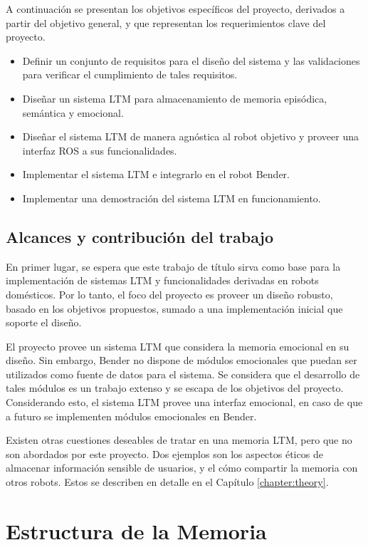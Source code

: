 A continuación se presentan los objetivos específicos del proyecto, derivados a partir del objetivo general, y que representan los requerimientos clave del proyecto.
\begin{itemize}
	\item Definir un conjunto de requisitos para el diseño del sistema y las validaciones para verificar el cumplimiento de tales requisitos.
	\item Diseñar un sistema LTM para almacenamiento de memoria episódica, semántica y emocional.
	\item Diseñar el sistema LTM de manera agnóstica al robot objetivo y proveer una interfaz ROS a sus funcionalidades.
	\item Implementar el sistema LTM e integrarlo en el robot Bender.
	\item Implementar una demostración del sistema LTM en funcionamiento.
\end{itemize}

\subsection{Alcances y contribución del trabajo}

En primer lugar, se espera que este trabajo de título sirva como base para la implementación de sistemas LTM y funcionalidades derivadas en robots domésticos. Por lo tanto, el foco del proyecto es proveer un diseño robusto, basado en los objetivos propuestos, sumado a una implementación inicial que soporte el diseño. 

El proyecto provee un sistema LTM que considera la memoria emocional en su diseño. Sin embargo, Bender no dispone de módulos emocionales que puedan ser utilizados como fuente de datos para el sistema. Se considera que el desarrollo de tales módulos es un trabajo extenso y se escapa de los objetivos del proyecto. Considerando esto, el sistema LTM provee una interfaz emocional, en caso de que a futuro se implementen módulos emocionales en Bender.

Existen otras cuestiones deseables de tratar en una memoria LTM, pero que no son abordados por este proyecto. Dos ejemplos son los aspectos éticos de almacenar información sensible de usuarios, y el cómo compartir la memoria con otros robots. Estos se describen en detalle en el Capítulo \ref{chapter:theory}.


\section{Estructura de la Memoria}

